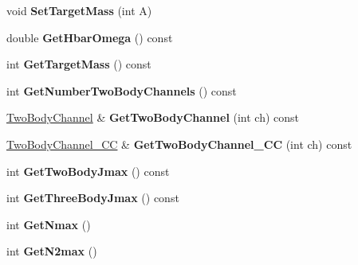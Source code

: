 \begin{DoxyCompactItemize}
\item 
\hypertarget{classModelSpace_ab29013a1b7b4b8b26d5905f97c135931}{void {\bfseries Set\-Target\-Mass} (int A)}\label{classModelSpace_ab29013a1b7b4b8b26d5905f97c135931}

\item 
\hypertarget{classModelSpace_a4cf15b20d8262cdab4ab1cadd412de7f}{double {\bfseries Get\-Hbar\-Omega} () const }\label{classModelSpace_a4cf15b20d8262cdab4ab1cadd412de7f}

\item 
\hypertarget{classModelSpace_a2f6a8428767c064a63796d4fc010e41e}{int {\bfseries Get\-Target\-Mass} () const }\label{classModelSpace_a2f6a8428767c064a63796d4fc010e41e}

\item 
\hypertarget{classModelSpace_a7c0b9152d68e069f9774078bd2a429b7}{int {\bfseries Get\-Number\-Two\-Body\-Channels} () const }\label{classModelSpace_a7c0b9152d68e069f9774078bd2a429b7}

\item 
\hypertarget{classModelSpace_ab2c315fd347fe93dd63246dea3d02f35}{\hyperlink{classTwoBodyChannel}{Two\-Body\-Channel} \& {\bfseries Get\-Two\-Body\-Channel} (int ch) const }\label{classModelSpace_ab2c315fd347fe93dd63246dea3d02f35}

\item 
\hypertarget{classModelSpace_a6709279838180ef0a6745320c9ad6926}{\hyperlink{classTwoBodyChannel__CC}{Two\-Body\-Channel\-\_\-\-C\-C} \& {\bfseries Get\-Two\-Body\-Channel\-\_\-\-C\-C} (int ch) const }\label{classModelSpace_a6709279838180ef0a6745320c9ad6926}

\item 
\hypertarget{classModelSpace_a3cbf323130388fae05fed1b59c5bac90}{int {\bfseries Get\-Two\-Body\-Jmax} () const }\label{classModelSpace_a3cbf323130388fae05fed1b59c5bac90}

\item 
\hypertarget{classModelSpace_a23ec9e8797755abfc0986b2e2c73a056}{int {\bfseries Get\-Three\-Body\-Jmax} () const }\label{classModelSpace_a23ec9e8797755abfc0986b2e2c73a056}

\item 
\hypertarget{classModelSpace_aa17b852a2902e4ec22a5c87f53de2dea}{int {\bfseries Get\-Nmax} ()}\label{classModelSpace_aa17b852a2902e4ec22a5c87f53de2dea}

\item 
\hypertarget{classModelSpace_a415e7663769bcab236a66c9914f9ff13}{int {\bfseries Get\-N2max} ()}\label{classModelSpace_a415e7663769bcab236a66c9914f9ff13}


\end{DoxyCompactItemize}
